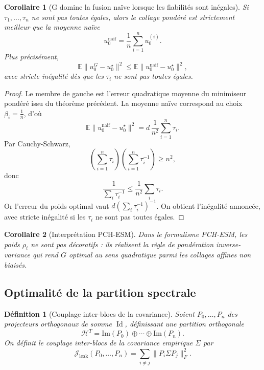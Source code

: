 \documentclass[11pt,a4paper]{article}
\newtheorem{definition}{Définition}[section]
\newtheorem{corollary}{Corollaire}[section]
\DeclareMathOperator{\Id}{Id}
\newcommand{\Hh}{\mathcal H}
\newcommand{\1}{\mathbf 1}
\begin{document}
\begin{corollary}[G domine la fusion naïve lorsque les fiabilités sont inégales]
Si \(\tau_1,\dots,\tau_n\) ne sont pas toutes égales, alors le collage pondéré est strictement meilleur que la moyenne naïve
\[
u_0^{\mathrm{naif}}=\frac1n\sum_{i=1}^n u_0^{(i)}.
\]
Plus précisément,
\[
\mathbb E\|u_0^{G}-u_0^\star\|^2
\le
\mathbb E\|u_0^{\mathrm{naif}}-u_0^\star\|^2,
\]
avec stricte inégalité dès que les \(\tau_i\) ne sont pas toutes égales.
\end{corollary}

\begin{proof}
Le membre de gauche est l'erreur quadratique moyenne du minimiseur pondéré issu du théorème précédent.
La moyenne naïve correspond au choix \(\beta_i=\frac1n\), d'où
\[
\mathbb E\|u_0^{\mathrm{naif}}-u_0^\star\|^2
=
d\,\frac{1}{n^2}\sum_{i=1}^n \tau_i.
\]
Par Cauchy-Schwarz,
\[
\left(\sum_{i=1}^n \tau_i\right)\left(\sum_{i=1}^n \tau_i^{-1}\right)\ge n^2,
\]
donc
\[
\frac{1}{\sum_i \tau_i^{-1}}
\le
\frac1{n^2}\sum_i \tau_i.
\]
Or l'erreur du poids optimal vaut \(d(\sum_i\tau_i^{-1})^{-1}\). On obtient l'inégalité annoncée, avec stricte inégalité si les \(\tau_i\) ne sont pas toutes égales.
\end{proof}

\begin{corollary}[Interprétation PCH-ESM]
Dans le formalisme PCH-ESM, les poids \(\rho_i\) ne sont pas décoratifs :
ils réalisent la règle de pondération inverse-variance qui rend \(G\) optimal au sens quadratique parmi les collages affines non biaisés.
\end{corollary}

\subsection{Optimalité de la partition spectrale}

\begin{definition}[Couplage inter-blocs de la covariance]
Soient \(P_0,\dots,P_n\) des projecteurs orthogonaux de somme \(\Id\), définissant une partition orthogonale
\[
\Hh^T=\mathrm{Im}(P_0)\oplus\cdots\oplus\mathrm{Im}(P_n).
\]
On définit le couplage inter-blocs de la covariance empirique \(\Sigma\) par
\[
\mathcal J_{\mathrm{leak}}(P_0,\dots,P_n)
=
\sum_{i\neq j}\|P_i\Sigma P_j\|_F^2.
\]
\end{definition}
\end{document}
